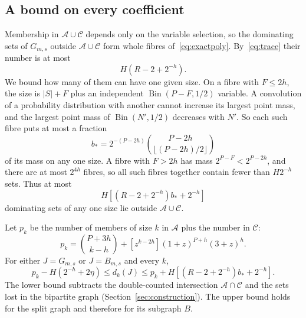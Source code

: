 \documentclass[11pt,a4paper]{article}
\theoremstyle{definition}
\theoremstyle{remark}
\newcommand{\Bin}{\operatorname{Bin}}
\newcommand{\cA}{\mathcal A}
\newcommand{\cC}{\mathcal C}
\begin{document}
\subsection{A bound on every coefficient}
Membership in $\cA\cup\cC$ depends only on the variable selection, so the dominating sets of $G_{m,s}$ outside $\cA\cup\cC$ form whole fibres of~\eqref{eq:exactpoly}. By~\eqref{eq:trace} their number is at most
\[
H(R-2+2^{-h}).
\]
We bound how many of them can have one given size. On a fibre with $F\le2h$, the size is $|S|+F$ plus an independent $\Bin(P-F,1/2)$ variable. A convolution of a probability distribution with another cannot increase its largest point mass, and the largest point mass of $\Bin(N',1/2)$ decreases with $N'$. So each such fibre puts at most a fraction
\[
b_* = 2^{-(P-2h)}
\binom{P-2h}{\lfloor(P-2h)/2\rfloor}
\]
of its mass on any one size. A fibre with $F>2h$ has mass $2^{P-F}<2^{P-2h}$, and there are at most $2^{4h}$ fibres, so all such fibres together contain fewer than $H2^{-h}$ sets. Thus at most
\begin{equation}\label{eq:respoint}
H\left[(R-2+2^{-h})b_*+2^{-h}\right]
\end{equation}
dominating sets of any one size lie outside $\cA\cup\cC$.

Let $p_k$ be the number of members of size $k$ in $\cA$ plus the number in $\cC$:
\begin{equation}\label{eq:pk}
p_k=\binom{P+3h}{k-h}
+[z^{k-2h}](1+z)^{P+h}(3+z)^h .
\end{equation}
For either $J=G_{m,s}$ or $J=B_{m,s}$ and every $k$,
\begin{equation}\label{eq:bracket}
p_k-H(2^{-h}+2\eta)
\le d_k(J)\le
p_k+H\left[(R-2+2^{-h})b_*+2^{-h}\right].
\end{equation}
The lower bound subtracts the double-counted intersection $\cA\cap\cC$ and the sets lost in the bipartite graph (Section~\ref{sec:construction}). The upper bound holds for the split graph and therefore for its subgraph $B$.
\end{document}
